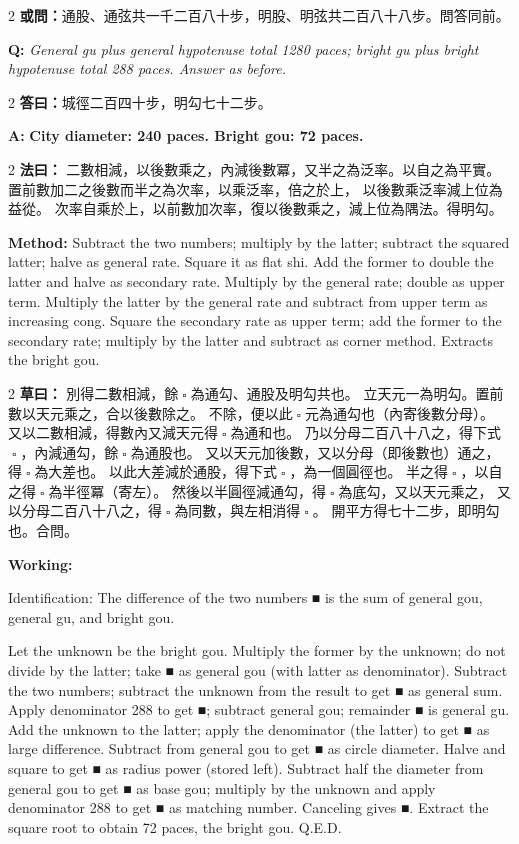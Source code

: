 \documentclass[11pt,a4paper]{article}
\let\origsquare\square
\renewcommand{\square}{\ensuremath{\origsquare}}%
\newcommand{\owen}[1]{%
  \noindent\textcolor{problemcolor}{\textbf{或問：}}{\tradfont #1}\par\nopagebreak%
}
\newcommand{\oweneng}[1]{%
  \noindent\textcolor{engcolor}{\textbf{Q: }}{\itshape #1}\par\nopagebreak%
}
\newcommand{\fayue}[1]{%
  \noindent\textcolor{methodcolor}{\textbf{法曰：}}{\tradfont #1}\par\nopagebreak%
}
\newcommand{\fayueeng}[1]{%
  \noindent\textcolor{engcolor}{\textbf{Method: }}{#1}\par\nopagebreak%
}
\newcommand{\tsaoyue}[1]{%
  \noindent\textcolor{workcolor}{\textbf{草曰：}}{\tradfont #1}\par%
}
\newcommand{\tsaoyueeng}[1]{%
  \noindent\textcolor{engcolor}{\textbf{Working: }}{\small #1}\par%
}
\newcommand{\dayue}[1]{%
  \noindent\textcolor{anscolor}{\textbf{答曰：}}{\tradfont #1}\par\nopagebreak%
}
\newcommand{\dayueeng}[1]{%
  \noindent\textcolor{engcolor}{\textbf{A: }}{\bfseries #1}\par\nopagebreak%
}
\begin{document}
\begin{paracol}{2}
\owen{通股、通弦共一千二百八十步，明股、明弦共二百八十八步。問答同前。}
\switchcolumn
\oweneng{General gu plus general hypotenuse total 1280 paces; bright gu plus bright hypotenuse total 288 paces. Answer as before.}
\end{paracol}

\begin{paracol}{2}
\dayue{城徑二百四十步，明勾七十二步。}
\switchcolumn
\dayueeng{City diameter: 240 paces. Bright gou: 72 paces.}
\end{paracol}

\begin{paracol}{2}
\fayue{%
二數相減，以後數乘之，內減後數冪，又半之為泛率。以自之為平實。
置前數加二之後數而半之為次率，以乘泛率，倍之於上，
以後數乘泛率減上位為益從。
次率自乘於上，以前數加次率，復以後數乘之，減上位為隅法。得明勾。}
\switchcolumn
\fayueeng{%
Subtract the two numbers; multiply by the latter; subtract the squared latter; halve as general rate. Square it as flat shi. Add the former to double the latter and halve as secondary rate. Multiply by the general rate; double as upper term. Multiply the latter by the general rate and subtract from upper term as increasing cong. Square the secondary rate as upper term; add the former to the secondary rate; multiply by the latter and subtract as corner method. Extracts the bright gou.}
\end{paracol}

\begin{paracol}{2}
\tsaoyue{%
別得二數相減，餘$ \; \square \; $為通勾、通股及明勾共也。
立天元一為明勾。置前數以天元乘之，合以後數除之。
不除，便以此$ \; \square \; $元為通勾也（內寄後數分母）。
又以二數相減，得數內又減天元得$ \; \square \; $為通和也。
乃以分母二百八十八之，得下式$ \; \square \; $，內減通勾，餘$ \; \square \; $為通股也。
又以天元加後數，又以分母（即後數也）通之，得$ \; \square \; $為大差也。
以此大差減於通股，得下式$ \; \square \; $，為一個圓徑也。
半之得$ \; \square \; $，以自之得$ \; \square \; $為半徑冪（寄左）。
然後以半圓徑減通勾，得$ \; \square \; $為底勾，又以天元乘之，
又以分母二百八十八之，得$ \; \square \; $為同數，與左相消得$ \; \square \; $。
開平方得七十二步，即明勾也。合問。}
\switchcolumn
\tsaoyueeng{%
Identification: The difference of the two numbers ■ is the sum of general gou, general gu, and bright gou.

Let the unknown be the bright gou. Multiply the former by the unknown; do not divide by the latter; take ■ as general gou (with latter as denominator). Subtract the two numbers; subtract the unknown from the result to get ■ as general sum. Apply denominator 288 to get ■; subtract general gou; remainder ■ is general gu. Add the unknown to the latter; apply the denominator (the latter) to get ■ as large difference. Subtract from general gou to get ■ as circle diameter. Halve and square to get ■ as radius power (stored left). Subtract half the diameter from general gou to get ■ as base gou; multiply by the unknown and apply denominator 288 to get ■ as matching number. Canceling gives ■. Extract the square root to obtain 72 paces, the bright gou. Q.E.D.}
\end{paracol}
\end{document}

